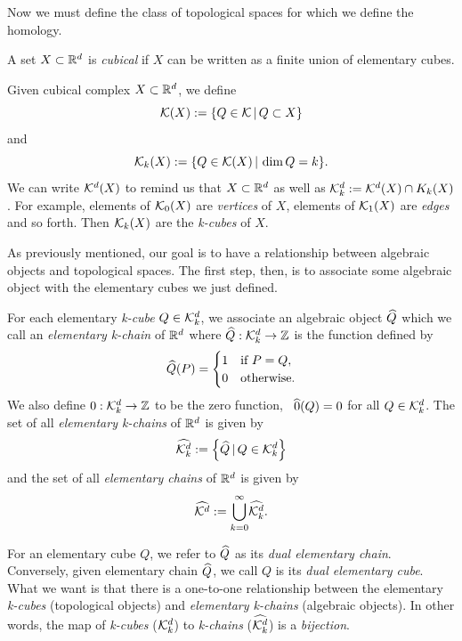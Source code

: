 \noindent {}

Now we must define the class of topological spaces for which we define the homology.

\begin{defn}
	A set $X \subset \mathbb{R}^d$ is \textit{cubical} if $X$ can be written as a finite union of elementary cubes.
\end{defn}

Given cubical complex $X \subset \mathbb{R}^d$, we define
	$$ \mathcal{K}(X) := \{ Q \in \mathcal{K} \, | \, Q \subset X \} $$ and
	$$ \mathcal{K}_k (X) := \{ Q \in \mathcal{K} (X) \, | \, \dim{Q} = k \}. $$
We can write $\mathcal{K}^{d} (X)$ to remind us that $X \subset \mathbb{R}^d$ as well as $\mathcal{K}^{d}_k := \mathcal{K}^{d}(X) \cap K_k(X)$. For example, elements of $\mathcal{K}_0(X)$ are \textit{vertices} of $X$, elements of $\mathcal{K}_1(X)$ are \textit{edges} and so forth. Then $\mathcal{K}_k(X)$ are the \textit{k-cubes} of $X$.

As previously mentioned, our goal is to have a relationship between algebraic objects and topological spaces. The first step, then, is to associate some algebraic object with the elementary cubes we just defined.

\begin{defn}
	For each elementary \textit{k-cube} $Q \in \mathcal{K}^{d}_k$, we associate an algebraic object $\widehat{Q}$ which we call an \textit{elementary k-chain} of $\mathbb{R}^d$ where $\widehat{Q} : \mathcal{K}^{d}_k \rightarrow \mathbb{Z}$ is the function defined by
	$$\widehat{Q}(P) =
		\begin{cases}
			1	& \text{if } P = Q, \\
			0	& \text{otherwise.}
		\end{cases}$$
	We also define $0 : \mathcal{K}^{d}_k \rightarrow \mathbb{Z}$ to be the zero function, \ie~$\widehat{0}(Q) = 0$ for all $Q \in \mathcal{K}^{d}_k$.
	The set of all \textit{elementary k-chains} of $\mathbb{R}^d$ is given by
	$$ \widehat{\mathcal{K}^{d}_k} := \left\{ \widehat{Q} \, | \, Q \in \mathcal{K}^{d}_k \right\} $$ and the set of all \textit{elementary chains} of $\mathbb{R}^d$ is given by
	$$ \widehat{\mathcal{K}^{d}} := { \bigcup_{k=0}^{\infty} } \widehat{\mathcal{K}^{d}_k} . $$
\end{defn}

For an elementary cube $Q$, we refer to $\widehat{Q}$ as its \textit{dual elementary chain}. Conversely, given elementary chain $\widehat{Q}$, we call $Q$ is its \textit{dual elementary cube}. What we want is that there is a one-to-one relationship between the elementary \textit{k-cubes} (topological objects) and \textit{elementary k-chains} (algebraic objects). In other words, the map of \textit{k-cubes} ($\mathcal{K}^{d}_k$) to \textit{k-chains} ($\widehat{\mathcal{K}^{d}_k}$) is a \textit{bijection}. 

